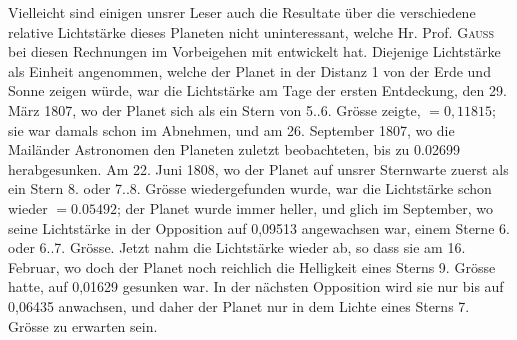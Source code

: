\par\indent Vielleicht sind einigen unsrer Leser auch die Resultate über die verschiedene relative Lichtstärke dieses Planeten nicht uninteressant, welche Hr. Prof. \textsc{Gauss} bei diesen Rechnungen im Vorbeigehen mit entwickelt hat. Diejenige Lichtstärke als Einheit angenommen, welche der Planet in der Distanz 1 von der Erde und Sonne zeigen würde, war die Lichtstärke am Tage der ersten Entdeckung, den 29. März 1807, wo der Planet sich als ein Stern von 5..6. Grösse zeigte, $= 0,11815$; sie war damals schon im Abnehmen, und am 26. September 1807, wo die Mailänder Astronomen den Planeten zuletzt beobachteten, bis zu 0.02699 herabgesunken. Am 22. Juni 1808, wo der Planet auf unsrer Sternwarte zuerst als ein Stern 8. oder 7..8. Grösse wiedergefunden wurde, war die Lichtstärke schon wieder $= 0.05492$; der Planet wurde immer heller, und glich im September, wo seine Lichtstärke in der Opposition auf 0,09513 angewachsen war, einem Sterne 6. oder 6..7. Grösse. Jetzt nahm die Lichtstärke wieder ab, so dass sie am 16. Februar, wo doch der Planet noch reichlich die Helligkeit eines Sterns 9. Grösse hatte, auf 0,01629 gesunken war. In der nächsten Opposition wird sie nur bis auf 0,06435 anwachsen, und daher der Planet nur in dem Lichte eines Sterns 7. Grösse zu erwarten sein.

